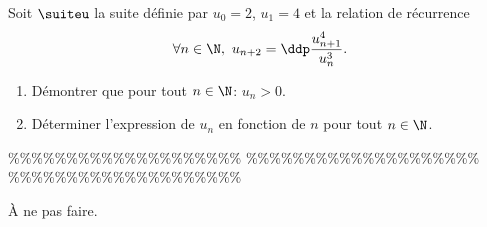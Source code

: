 


\begin{exercice}
Soit $\suiteu$ la suite d\'efinie par $u_0=2$, $u_1=4$ et la relation de r\'ecurrence
$$\forall n\in\N,\ u_{n+2}=\ddp\frac{u_{n+1}^4}{u_n^3}.$$
\begin{enumerate}
\item D\'emontrer que pour tout $n\in\N$: $u_n>0$.
\item D\'eterminer l'expression de $u_n$ en fonction de $n$ pour tout $n\in\N$.
\end{enumerate}
\end{exercice}


\%\%\%\%\%\%\%\%\%\%\%\%\%\%\%\%\%\%\%\%
\%\%\%\%\%\%\%\%\%\%\%\%\%\%\%\%\%\%\%\%
\%\%\%\%\%\%\%\%\%\%\%\%\%\%\%\%\%\%\%\%



\begin{correction}
\`{A} ne pas faire.
\end{correction}